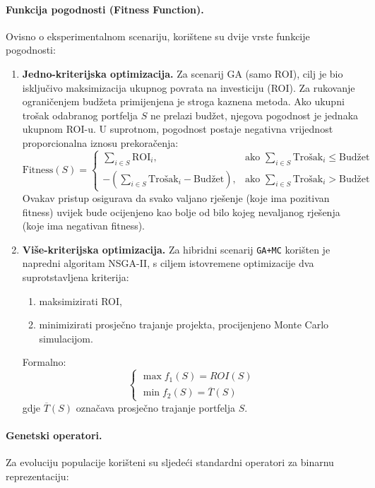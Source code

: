 \paragraph{Funkcija pogodnosti (Fitness Function).}
Ovisno o eksperimentalnom scenariju, korištene su dvije vrste funkcije pogodnosti:

\begin{enumerate}
    \item \textbf{Jedno-kriterijska optimizacija.}  
Za scenarij GA (samo ROI), cilj je bio isključivo maksimizacija ukupnog povrata na investiciju (ROI). Za rukovanje ograničenjem budžeta primijenjena je stroga kaznena metoda. Ako ukupni trošak odabranog portfelja $S$ ne prelazi budžet, njegova pogodnost je jednaka ukupnom ROI-u. U suprotnom, pogodnost postaje negativna vrijednost proporcionalna iznosu prekoračenja:
$$
\text{Fitness}(S) = 
\begin{cases}
    \sum_{i \in S} \text{ROI}_i, & \text{ako } \sum_{i \in S} \text{Trošak}_i \leq \text{Budžet} \\
    -\left(\sum_{i \in S} \text{Trošak}_i - \text{Budžet}\right), & \text{ako } \sum_{i \in S} \text{Trošak}_i > \text{Budžet}
\end{cases}
$$
Ovakav pristup osigurava da svako valjano rješenje (koje ima pozitivan fitness) uvijek bude ocijenjeno kao bolje od bilo kojeg nevaljanog rješenja (koje ima negativan fitness).    \item \textbf{Više-kriterijska optimizacija.}  
    Za hibridni scenarij \texttt{GA+MC} korišten je napredni algoritam NSGA-II, s ciljem istovremene optimizacije dva suprotstavljena kriterija:
    \begin{enumerate}
        \item maksimizirati ROI,
        \item minimizirati prosječno trajanje projekta, procijenjeno Monte Carlo simulacijom.
    \end{enumerate}
    Formalno:
    \[
    \begin{cases}
    \max f_1(S) = ROI(S) \\
    \min f_2(S) = \overline{T}(S)
    \end{cases}
    \]
    gdje $\overline{T}(S)$ označava prosječno trajanje portfelja $S$.
\end{enumerate}

\paragraph{Genetski operatori.}
Za evoluciju populacije korišteni su sljedeći standardni operatori za binarnu reprezentaciju:

